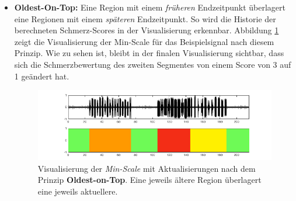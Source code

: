 \begin{itemize}
\item \textbf{Oldest-On-Top: } Eine Region mit einem \emph{früheren} Endzeitpunkt überlagert eine Regionen mit einem \emph{späteren} Endzeitpunkt. So wird die Historie der berechneten Schmerz-Scores in der Visualisierung erkennbar. Abbildung \ref{fig:viz_act_under} zeigt die Visualisierung der Min-Scale für das Beispielsignal nach diesem Prinzip. Wie zu sehen ist, bleibt in der finalen Visualisierung sichtbar, dass sich die Schmerzbewertung des zweiten Segmentes von einem Score von 3 auf 1 geändert hat.

\begin{figure}[h]
	\centering
	\includegraphics[trim={3cm 0 2cm 0},clip,width=1\textwidth]{bilder/viz_act_under_02.png}
	\caption[Visualisierung bei Aktualisierungen nach dem Prinzip Oldest-on-Top]{Visualisierung der \emph{Min-Scale} mit Aktualisierungen nach dem Prinzip \textbf{Oldest-on-Top}. Eine jeweils \glqq ältere\grqq{} Region überlagert eine jeweils \glqq aktuellere\grqq{}.}
	\label{fig:viz_act_under}
\end{figure}
 
\end{itemize}
